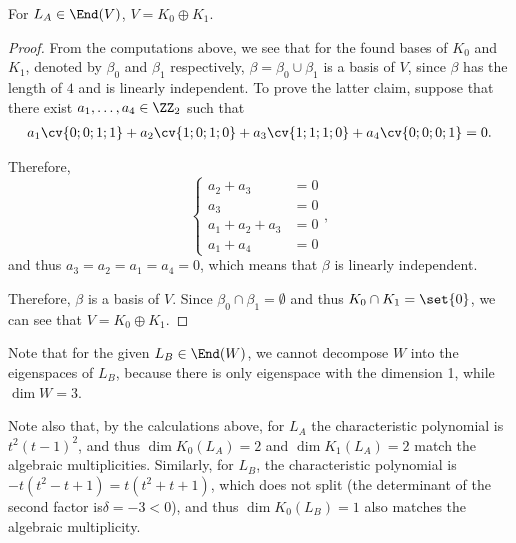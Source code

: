 \documentclass[11pt]{scrartcl}
\begin{document}
\begin{lemma}
  For $L_A \in \End(V)$, $V = K_{0}\oplus K_1$.
\end{lemma}
\begin{proof}
  \hfill

  From the computations above, we see that for the found bases of
  $K_0$ and $K_1$, denoted by $\beta_0$ and $\beta_1$ respectively,
  $\beta = \beta_0\cup\beta_1$ is a basis of $V$, since $\beta$ has
  the length of $4$ and is linearly independent. To prove the latter
  claim, suppose that there exist $a_1, \dots, a_4\in \ZZ_2$ such that
  \begin{align}
    a_1\cv{0;0;1;1}+a_2\cv{1;0;1;0}+a_3\cv{1;1;1;0}+a_4\cv{0;0;0;1} = 0.
  \end{align}

Therefore, 
\begin{equation*}
  \begin{cases}
    a_2+a_3     & =0  \\
    a_3         & = 0 \\
    a_1+a_2+a_3 & = 0 \\
    a_1+a_4     & = 0
  \end{cases},
\end{equation*}
and thus $a_3=a_2=a_1=a_4=0$, which means that $\beta$ is linearly
independent.

Therefore, $\beta$ is a basis of $V$. Since
$\beta_0\cap\beta_1=\emptyset$ and thus $K_0\cap K_1=\set{0}$, we can
see that $V = K_0\oplus K_1$.
\end{proof}

Note that for the given $L_B \in \End(W)$, we cannot decompose $W$ into the eigenspaces of $L_{B}$, because there is only eigenspace with the dimension 1, while $\dim W = 3$.

Note also that, by the calculations above, for $L_{A}$ the
characteristic polynomial is $t^2(t-1)^{2}$, and thus
$\dim K_0(L_A) = 2$ and $\dim K_1(L_A)=2$ match the algebraic
multiplicities. Similarly, for $L_{B}$, the characteristic polynomial
is $-t(t^2-t+1) = t(t^2+t+1)$, which does not split (the determinant
of the second factor is$\delta=-3<0$), and thus $\dim K_0(L_B) = 1$
also matches the algebraic multiplicity.
\end{document}
